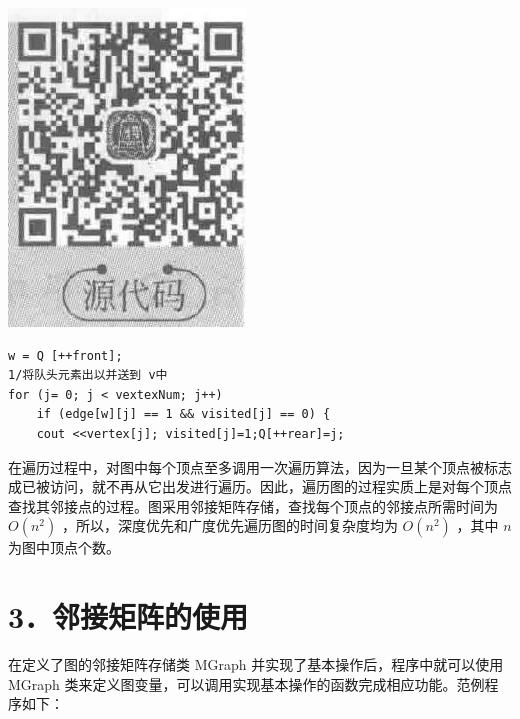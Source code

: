 \documentclass[10pt]{article}
\begin{document}
\begin{center}
\includegraphics[max width=\textwidth]{2025_06_06_704745ea57b15b2333e5g-194(1)}
\end{center}

\begin{verbatim}
w = Q [++front];
1/将队头元素出以并送到 v中
for (j= 0; j < vextexNum; j++)
    if (edge[w][j] == 1 && visited[j] == 0) {
    cout <<vertex[j]; visited[j]=1;Q[++rear]=j;
\end{verbatim}

在遍历过程中，对图中每个顶点至多调用一次遍历算法，因为一旦某个顶点被标志成已被访问，就不再从它出发进行遍历。因此，遍历图的过程实质上是对每个顶点查找其邻接点的过程。图采用邻接矩阵存储，查找每个顶点的邻接点所需时间为 $O\left(n^{2}\right)$ ，所以，深度优先和广度优先遍历图的时间复杂度均为 $O\left(n^{2}\right)$ ，其中 $n$ 为图中顶点个数。

\section*{3．邻接矩阵的使用}
在定义了图的邻接矩阵存储类 MGraph 并实现了基本操作后，程序中就可以使用 MGraph 类来定义图变量，可以调用实现基本操作的函数完成相应功能。范例程序如下：
\end{document}
